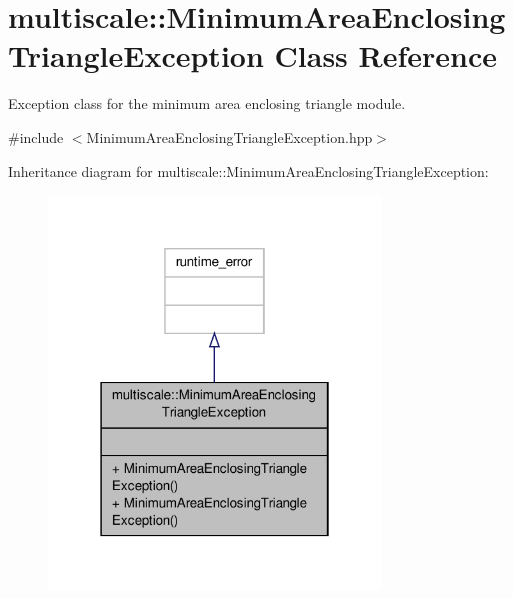 \hypertarget{classmultiscale_1_1MinimumAreaEnclosingTriangleException}{\section{multiscale\-:\-:Minimum\-Area\-Enclosing\-Triangle\-Exception Class Reference}
\label{classmultiscale_1_1MinimumAreaEnclosingTriangleException}
}


Exception class for the minimum area enclosing triangle module.  




{\ttfamily \#include $<$Minimum\-Area\-Enclosing\-Triangle\-Exception.\-hpp$>$}



Inheritance diagram for multiscale\-:\-:Minimum\-Area\-Enclosing\-Triangle\-Exception\-:\nopagebreak
\begin{figure}[H]
\begin{center}
\leavevmode
\includegraphics[width=250pt]{classmultiscale_1_1MinimumAreaEnclosingTriangleException__inherit__graph}
\end{center}
\end{figure}


